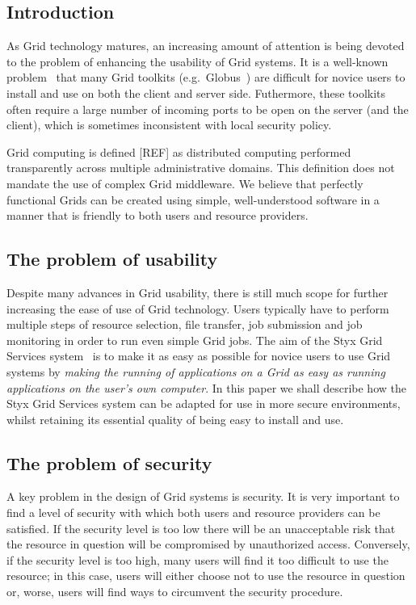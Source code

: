 \documentclass[a4paper]{article}
\begin{document}
\begin{multicols}{2}

\section{Introduction}
As Grid technology matures, an increasing amount of attention is being devoted to the problem of enhancing the usability of Grid systems.  It is a well-known problem~\cite{chin:2004} that many Grid toolkits (e.g.\ Globus~\cite{globustoolkit}) are difficult for novice users to install and use on both the client and server side.  Futhermore, these toolkits often require a large number of incoming ports to be open on the server (and the client), which is sometimes inconsistent with local security policy.

Grid computing is defined [REF] as distributed computing performed transparently across multiple administrative domains.  This definition does not mandate the use of complex Grid middleware.  We believe that perfectly functional Grids can be created using simple, well-understood software in a manner that is friendly to both users and resource providers.

\subsection{The problem of usability}
Despite many advances in Grid usability, there is still much scope for further increasing the ease of use of Grid technology.  Users typically have to perform multiple steps of resource selection, file transfer, job submission and job monitoring in order to run even simple Grid jobs.  The aim of the Styx Grid Services system~\cite{blower:2006} is to make it as easy as possible for novice users to use Grid systems by {\em making the running of applications on a Grid as easy as running applications on the user's own computer\/}.  In this paper we shall describe how the Styx Grid Services system can be adapted for use in more secure environments, whilst retaining its essential quality of being easy to install and use.

\subsection{The problem of security}
A key problem in the design of Grid systems is security.  It is very important to find a level of security with which both users and resource providers can be satisfied.  If the security level is too low there will be an unacceptable risk that the resource in question will be compromised by unauthorized access.  Conversely, if the security level is too high, many users will find it too difficult to use the resource; in this case, users will either choose not to use the resource in question or, worse, users will find ways to circumvent the security procedure.


\end{multicols}
\end{document}
